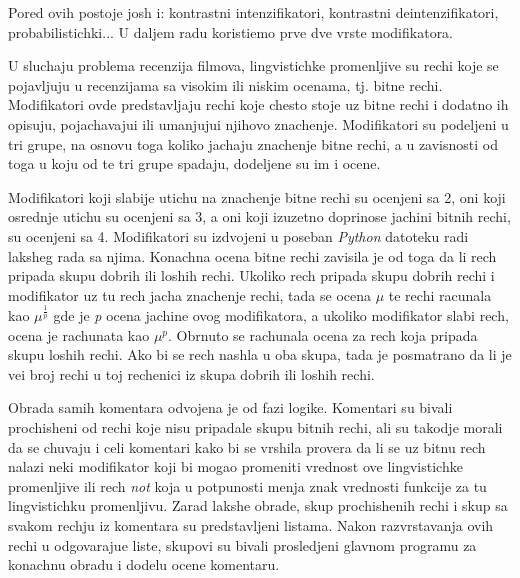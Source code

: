 \documentclass[cyr]{bibl}
\begin{document}
\begin{justify}
\begin{itemize}
\begin{justify}
    \end{justify}
	
\end{itemize} 

Pored ovih postoje josh i: kontrastni intenzifikatori, kontrastni deintenzifikatori, probabilistichki... U daljem radu koristi\cc emo prve dve vrste modifikatora.

U sluchaju problema recenzija filmova, lingvistichke promenljive su rechi koje se pojavljuju u recenzijama sa visokim ili niskim ocenama, tj. bitne rechi. Modifikatori ovde predstavljaju rechi koje chesto stoje uz bitne rechi i dodatno ih opisuju, pojachavaju\cc i ili umanjuju\cc i njihovo znachenje. Modifikatori su podeljeni u tri grupe, na osnovu toga koliko jachaju znachenje bitne rechi, a u zavisnosti od toga u koju od te tri grupe spadaju, dodeljene su im i ocene.

Modifikatori koji slabije utichu na znachenje bitne rechi su ocenjeni sa 2, oni koji osrednje utichu su ocenjeni sa 3, a oni koji izuzetno doprinose jachini bitnih rechi, su ocenjeni sa 4.
Modifikatori su izdvojeni u poseban \textit{\Lat Python} datoteku radi laksheg rada sa njima. Konachna ocena bitne rechi zavisila je od toga da li rech pripada skupu dobrih ili loshih rechi. Ukoliko rech pripada skupu dobrih rechi i modifikator uz tu rech jacha znachenje rechi, tada se ocena \(\mu\) te rechi racunala kao \(\mu^{\frac{1}{p}}\) gde je \textit{\Lat p} ocena jachine ovog modifikatora, a ukoliko modifikator slabi rech, ocena je rachunata kao \(\mu^{p}\). Obrnuto se rachunala ocena za rech koja pripada skupu loshih rechi. Ako bi se rech nashla u oba skupa, tada je posmatrano da li je ve\cc i broj rechi u toj rechenici iz skupa dobrih ili loshih rechi.

Obrada samih komentara odvojena je od fazi logike. Komentari su bivali prochish\cc eni od rechi koje nisu pripadale skupu bitnih rechi, ali su takodje morali da se chuvaju i celi komentari kako bi se vrshila provera da li se uz bitnu rech nalazi neki modifikator koji bi mogao promeniti vrednost ove lingvistichke promenljive ili rech \textit{\Lat not} koja u potpunosti menja znak vrednosti funkcije za tu lingvistichku promenljivu.
Zarad lakshe obrade, skup prochish\cc enih rechi i skup sa svakom rechju iz komentara su predstavljeni listama. Nakon razvrstavanja ovih rechi u odgovaraju\cc e liste, skupovi su bivali prosledjeni glavnom programu za konachnu obradu i dodelu ocene komentaru.
\end{justify}
\end{document}
